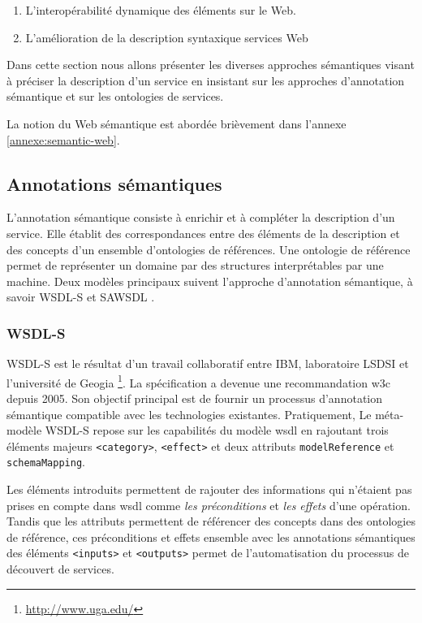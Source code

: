 \begin{enumerate}
  \item L'interopérabilité dynamique des éléments sur le Web.
  \item L'amélioration de la description syntaxique services Web
\end{enumerate}

Dans cette section nous allons présenter les diverses approches
sémantiques visant à préciser la description d'un service en insistant
sur les approches d'annotation sémantique et sur les ontologies de
services.

La notion du Web sémantique est abordée brièvement dans l'annexe
\ref{annexe:semantic-web}.

  \subsection{Annotations sémantiques}
  \label{sec:semantic-annot}

  L'annotation sémantique consiste à enrichir et à compléter la
  description d'un service. Elle établit des correspondances entre des
  éléments de la description et des concepts d'un ensemble
  d'ontologies de références. Une ontologie de référence permet de
  représenter un domaine par des structures interprétables par une
  machine. Deux modèles principaux suivent l'approche d'annotation
  sémantique, à savoir \textsc{WSDL-S} et \textsc{SAWSDL}
  \cite{elie2010}.

    \subsubsection{WSDL-S}
    \textsc{WSDL-S} \cite{akkiraju2005web} est le résultat d'un
    travail collaboratif entre IBM, laboratoire LSDSI et l'université
    de Geogia \footnote{\url{http://www.uga.edu/}}. La spécification a
    devenue une recommandation \acrshort{w3c} depuis 2005. Son
    objectif principal est de fournir un processus d'annotation
    sémantique compatible avec les technologies
    existantes. Pratiquement, Le méta-modèle \textsc{WSDL-S} repose
    sur les capabilités du modèle \acrshort{wsdl} en rajoutant trois
    éléments majeurs \texttt{<category>}, \texttt{<effect>} et deux
    attributs \texttt{modelReference} et \texttt{schemaMapping}.

    Les éléments introduits permettent de rajouter des informations
    qui n'étaient pas prises en compte dans \acrshort{wsdl} comme
    \emph{les préconditions} et \emph{les effets} d'une
    opération. Tandis que les attributs permettent de référencer des
    concepts dans des ontologies de référence, ces préconditions et
    effets ensemble avec les annotations sémantiques des éléments
    \texttt{<inputs>} et \texttt{<outputs>} permet de l'automatisation
    du processus de découvert de services.

